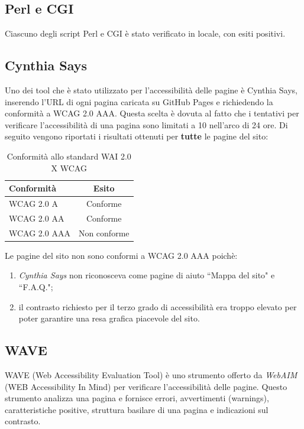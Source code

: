 \subsection{Perl e CGI}
Ciascuno degli script Perl e CGI è stato verificato in locale, con esiti
positivi.

\subsection{Cynthia Says}
Uno dei tool che è stato utilizzato per l'accessibilità delle pagine è Cynthia
Says, inserendo l'URL di ogni pagina caricata su GitHub Pages e richiedendo la
conformità a WCAG 2.0 AAA. Questa scelta è dovuta al fatto che i tentativi per
verificare l'accessibilità di una pagina sono limitati a 10 nell'arco di 24
ore.
Di seguito vengono riportati i risultati ottenuti per \textbf{tutte} le pagine
del sito:

\begin{table}[h!]
\begin{center}
\begin{tabular}{ | l | c | }
  \hline
  Conformità & Esito \\
  \hline
  WCAG 2.0 A & Conforme \\
  \hline
  WCAG 2.0 AA & Conforme \\
  \hline
  WCAG 2.0 AAA & Non conforme \\
  \hline
\end{tabular}
\caption{Conformità allo standard WAI 2.0 X WCAG}
\end{center}
\end{table}

Le pagine del sito non sono conformi a WCAG 2.0 AAA poichè:
\begin{enumerate}
\item \textit{Cynthia Says} non riconosceva come pagine di aiuto ``Mappa del
sito" e ``F.A.Q.";
\item il contrasto richiesto per il terzo grado di accessibilità era troppo
elevato per poter garantire una resa grafica piacevole del sito.
\end{enumerate}

\subsection{WAVE}
WAVE (Web Accessibility Evaluation Tool) è uno strumento offerto da
\textit{WebAIM} (WEB Accessibility In Mind) per verificare l'accessibilità
delle pagine. Questo strumento analizza una pagina e fornisce errori,
avvertimenti (warnings), caratteristiche positive, struttura basilare di una
pagina e indicazioni sul contrasto.

